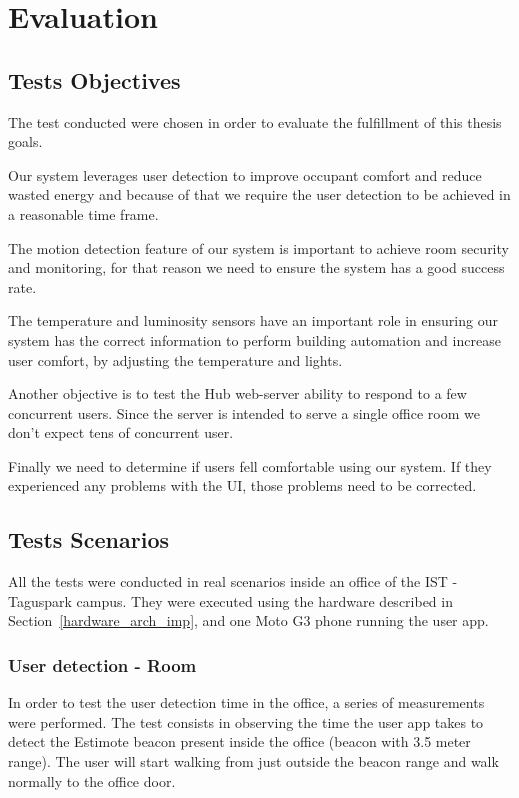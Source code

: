 \chapter{Evaluation}
\label{chapter:evaluation}

\section{Tests Objectives}

The test conducted were chosen in order to evaluate the fulfillment of this thesis goals.

Our system leverages user detection to improve occupant comfort and reduce wasted energy and because of that we require the user detection to be achieved in a reasonable time frame.

The motion detection feature of our system is important to achieve room security and monitoring, for that reason we need to ensure the system has a good success rate. 

The temperature and luminosity sensors have an important role in ensuring our system has the correct information to perform building automation and increase user comfort, by adjusting the temperature and lights. 

Another objective is to test the Hub web-server ability to respond to a few concurrent users. Since the server is intended to serve a single office room we don't expect tens of concurrent user.

Finally we need to determine if users fell comfortable using our system. If they experienced any problems with the \ac{UI}, those problems need to be corrected.


\section{Tests Scenarios}



All the tests were conducted in real scenarios inside an office of the \ac{IST} - Taguspark campus. They
were executed using the hardware described in Section~\ref{hardware_arch_imp}, and one Moto G3 phone running the user app.


\subsection{User detection - Room}


In order to test the  user detection time in the office, a series of measurements were performed. The test consists in observing the time the user app takes to detect the Estimote beacon present inside the office (beacon with 3.5 meter range). The user will start walking from just outside the beacon range and walk normally to the office door.

